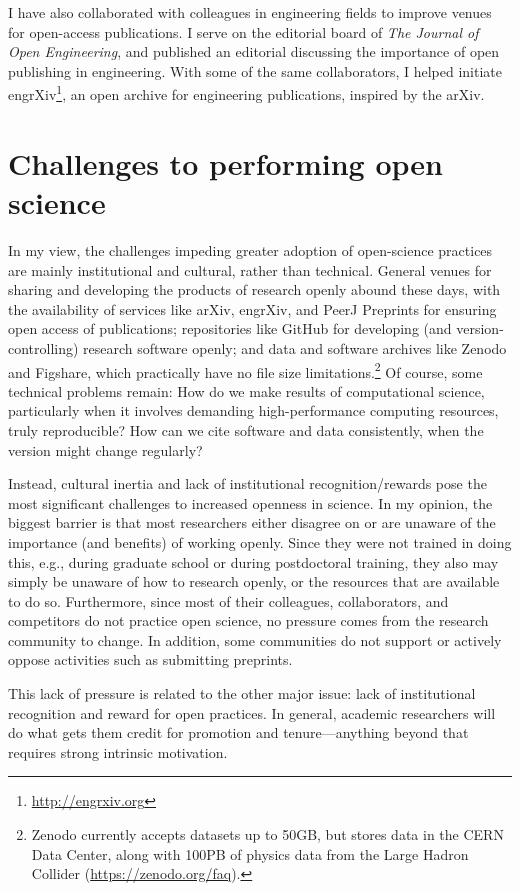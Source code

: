 \documentclass[nobib]{tufte-handout}
\begin{document}
I have also collaborated with colleagues in engineering fields to improve
venues for open-access publications. I serve on the editorial board of
\textit{The Journal of Open Engineering},
and published an editorial discussing the importance of open publishing in
engineering\autocite{TJOE:editorial}. With some of the same collaborators, I
helped initiate engrXiv\footnote{\url{http://engrxiv.org}}, an open archive
for engineering publications, inspired by the arXiv.


\section{Challenges to performing open science}
\label{sec:challenges}

In my view, the challenges impeding greater adoption of open-science practices
are mainly institutional and cultural, rather than technical. General venues for sharing
and developing the products of research openly abound these days, with the availability
of services like arXiv, engrXiv, and PeerJ Preprints for ensuring open access of
publications; repositories like GitHub for developing (and version-controlling)
research software openly; and data and software archives like Zenodo and Figshare,
which practically have no file size limitations.\footnote{Zenodo currently accepts
datasets up to 50GB, but stores data in the CERN Data Center, along with 100PB of
physics data from the Large Hadron Collider (\url{https://zenodo.org/faq}).}
Of course, some technical problems remain: How do we make results of computational
science, particularly when it involves demanding high-performance computing resources,
truly reproducible? How can we cite software and data consistently, when
the version might change regularly?

Instead, cultural inertia and lack of institutional recognition\slash rewards pose
the most significant challenges to increased openness in science. In my opinion,
the biggest barrier is that most researchers either disagree on or are unaware of
the importance (and benefits) of working openly. Since they were not trained in
doing this, e.g., during graduate school or during postdoctoral training, they
also may simply be unaware of how to research openly, or the resources that are
available to do so. Furthermore, since most of their colleagues, collaborators,
and competitors do not practice open science, no pressure comes from the
research community to change. In addition, some communities do not support or
actively oppose activities such as submitting preprints.

This lack of pressure is related to the other major issue: lack of institutional
recognition and reward for open practices. In general, academic researchers will
do what gets them credit for promotion and tenure---anything beyond that requires
strong intrinsic motivation.

%
%
\printbibliography
\end{document}
